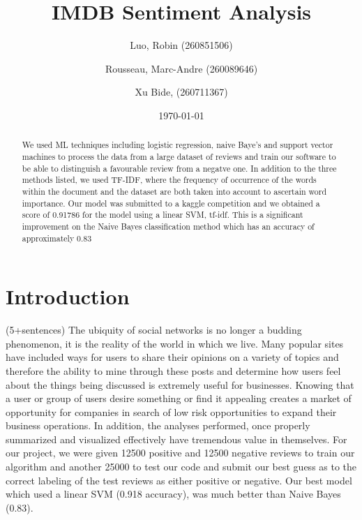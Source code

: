 \documentclass{amsart}
\theoremstyle{definition}
\theoremstyle{remark}
\numberwithin{equation}{section}
\begin{document}
\vspace*{-80pt}

\title{IMDB Sentiment Analysis}

\author{Luo, Robin (260851506)}
\author{Rousseau, Marc-Andre  (260089646)}
\author{Xu Bide, (260711367)}

\date{\today}
\begin{abstract}
We used ML techniques including logistic regression, naive Baye's and support vector machines to process the data from a large dataset of reviews and train our software to be able to distinguish a favourable review from a negatve one.  In addition to the three methods listed, we used TF-IDF, where the frequency of occurrence of the words within the document and the dataset are both taken into account to ascertain word importance.  Our model was submitted to a kaggle competition and we obtained a score of 0.91786 for the model using a linear SVM, tf-idf.  This is a significant improvement on the Naive Bayes classification method which has an accuracy of approximately 0.83 \end{abstract}
\maketitle
\section{Introduction}(5+sentences)
The ubiquity of social networks is no longer a budding phenomenon, it is the reality of the world in which we live.  Many popular sites have included ways for users to share their opinions on a variety of topics and therefore the ability to mine through these posts and determine how users feel about the things being discussed is extremely useful for businesses.  Knowing that a user or group of users desire something or find it appealing creates a market of opportunity for companies in search of low risk opportunities to expand their business operations.  In addition, the analyses performed, once properly summarized and visualized effectively have tremendous value in themselves.  For our project, we were given 12500 positive and 12500 negative reviews to train our algorithm and another 25000 to test our code and submit our best guess as to the correct labeling of the test reviews as either positive or negative.  Our best model which used a linear SVM (0.918 accuracy), was much better than Naive Bayes (0.83).
\end{document}
